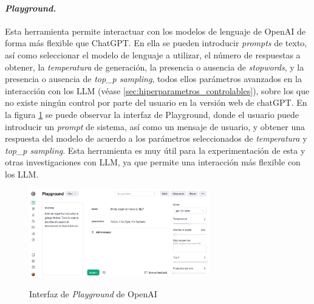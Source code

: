         \paragraph{\textit{Playground.}} Esta herramienta permite interactuar con los modelos de lenguaje de OpenAI de forma más flexible que ChatGPT. En ella se pueden introducir \textit{prompts} de texto, así como seleccionar el modelo de lenguaje a utilizar, el número de respuestas a obtener, la \textit{temperatura} de generación, la presencia o ausencia de \textit{stopwords}, y la presencia o ausencia de \textit{top\_p sampling}, todos ellos parámetros avanzados en la interacción con los LLM (véase \ref{sec:hiperparametros_controlables}), sobre los que no existe ningún control por parte del usuario en la versión web de chatGPT. En la figura \ref{fig:playground} se puede observar la interfaz de Playground, donde el usuario puede introducir un \textit{prompt} de sistema, así como un mensaje de usuario, y obtener una respuesta del modelo de acuerdo a los parámetros seleccionados de \textit{temperatura} y \textit{top\_p sampling}. Esta herramienta es muy útil para la experimentación de esta y otras investigaciones con LLM, ya que permite una interacción más flexible con los LLM.

        \begin{figure}[h]
            \caption[Interfaz de \textit{Playground} de OpenAI]{Interfaz de \textit{Playground} de OpenAI}
            \centering
            \includegraphics[width=0.7\textwidth]{./figuras/interfaz_playground.png}
            \label{fig:playground}
        \end{figure}

